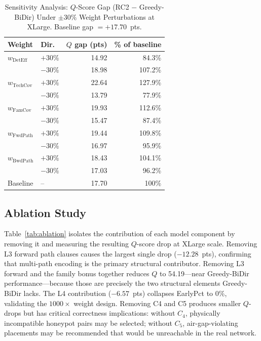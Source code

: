 \documentclass[journal]{IEEEtran}
\begin{document}
\begin{table}[t]
\caption{Sensitivity Analysis: $Q$-Score Gap (RC2 $-$ Greedy-BiDir)
  Under $\pm30\%$ Weight Perturbations at XLarge.
  Baseline gap $= +17.70$~pts.}
\label{tab:sensitivity}
\centering
\renewcommand{\arraystretch}{1.2}
\begin{tabular}{llrr}
\toprule
Weight & Dir. & $Q$ gap (pts) & \% of baseline \\
\midrule
$w_{\mathrm{DetEff}}$ & $+30\%$ & 14.92 & 84.3\% \\
                       & $-30\%$ & 18.98 & 107.2\% \\
$w_{\mathrm{TechCov}}$& $+30\%$ & 22.64 & 127.9\% \\
                       & $-30\%$ & 13.79 & 77.9\% \\
$w_{\mathrm{FamCov}}$ & $+30\%$ & 19.93 & 112.6\% \\
                       & $-30\%$ & 15.47 & 87.4\% \\
$w_{\mathrm{FwdPath}}$& $+30\%$ & 19.44 & 109.8\% \\
                       & $-30\%$ & 16.97 & 95.9\% \\
$w_{\mathrm{BwdPath}}$& $+30\%$ & 18.43 & 104.1\% \\
                       & $-30\%$ & 17.03 & 96.2\% \\
\midrule
Baseline & -- & 17.70 & 100\% \\
\bottomrule
\end{tabular}
\end{table}

\subsection{Ablation Study}
\label{sec:results:ablation}

Table~\ref{tab:ablation} isolates the contribution of each model
component by removing it and measuring the resulting $Q$-score drop at
XLarge scale. Removing L3 forward path clauses causes the largest
single drop ($-12.28$~pts), confirming that multi-path encoding is the
primary structural contributor. Removing L3 forward and the family
bonus together reduces $Q$ to 54.19---near Greedy-BiDir
performance---because those are precisely the two structural elements
Greedy-BiDir lacks. The L4 contribution ($-6.57$~pts) collapses
EarlyPct to 0\%, validating the $1000\times$ weight design. Removing
C4 and C5 produces smaller $Q$-drops but has critical correctness
implications: without $C_4$, physically incompatible honeypot pairs
may be selected; without $C_5$, air-gap-violating placements may be
recommended that would be unreachable in the real network.
\end{document}
